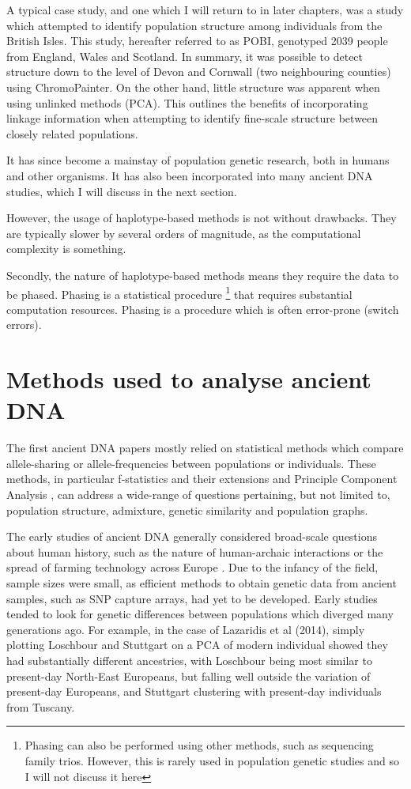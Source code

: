 A typical case study, and one which I will return to in later chapters, was a study which attempted to identify population structure among individuals from the British Isles. This study, hereafter referred to as POBI, genotyped 2039 people from England, Wales and Scotland. In summary, it was possible to detect structure down to the level of Devon and Cornwall (two neighbouring counties) using ChromoPainter. On the other hand, little structure was apparent when using unlinked methods (PCA). This outlines the benefits of incorporating linkage information when attempting to identify fine-scale structure between closely related populations.


It has since become a mainstay of population genetic research, both in humans and other organisms. It has also been incorporated into many ancient DNA studies, which I will discuss in the next section. 

However, the usage of haplotype-based methods is not without drawbacks. They are typically slower by several orders of magnitude, as the computational complexity is something. 

Secondly, the nature of haplotype-based methods means they require the data to be phased. Phasing is a statistical procedure \footnote{Phasing can also be performed using other methods, such as sequencing family trios. However, this is rarely used in population genetic studies and so I will not discuss it here} that requires substantial computation resources. Phasing is a procedure which is often error-prone (switch errors).


\section{Methods used to analyse ancient DNA}

The first ancient DNA papers mostly relied on statistical methods which compare allele-sharing or allele-frequencies between populations or individuals. These methods, in particular f-statistics and their extensions \cite{Green2010, Patterson2012, peter2016admixture} and Principle Component Analysis \cite{price2006principal}, can address a wide-range of questions pertaining, but not limited to, population structure, admixture, genetic similarity and population graphs. 

The early studies of ancient DNA generally considered broad-scale questions about human history, such as the nature of human-archaic interactions or the spread of farming technology across Europe \cite{Lazaridis2014}. Due to the infancy of the field, sample sizes were small, as efficient methods to obtain genetic data from ancient samples, such as SNP capture arrays, had yet to be developed. Early studies tended to look for genetic differences between populations which diverged many generations ago. For example, in the case of Lazaridis et al (2014), simply plotting Loschbour and Stuttgart on a PCA of modern individual showed they had substantially different ancestries, with Loschbour being most similar to present-day North-East Europeans, but falling well outside the variation of present-day Europeans, and Stuttgart clustering with present-day individuals from Tuscany. 

